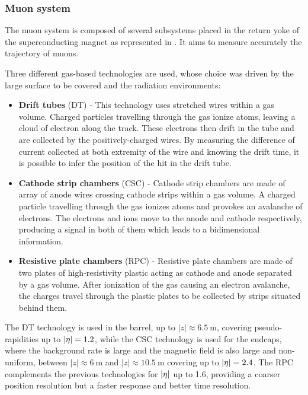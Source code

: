         \subsubsection{Muon system}

    The muon system is composed of several subsystems placed in the return yoke
    of the superconducting magnet as represented in . It
    aims to measure accurately the trajectory of muons.


    Three different gas-based technologies are used, whose choice was driven by
    the large surface to be covered and the radiation environments:
    \begin{itemize}
        \item \textbf{Drift tubes} (DT) - This technology uses stretched wires
            within a gas volume. Charged particles travelling through the gas
            ionize atoms, leaving a cloud of electron along the track. These
            electrons then drift in the tube and are collected by the
            positively-charged wires. By measuring the difference of current
            collected at both extremity of the wire and knowing the drift time,
            it is possible to infer the position of the hit in the drift tube.
        \item \textbf{Cathode strip chambers} (CSC) - Cathode strip chambers are
            made of array of anode wires crossing cathode strips within a gas
            volume.  A charged particle travelling through the gas ionizes atoms
            and provokes an avalanche of electrons. The electrons and ions move
            to the anode and cathode respectively, producing a signal in both of
            them which leads to a bidimensional information.
        \item \textbf{Resistive plate chambers} (RPC) - Resistive plate chambers
            are made of two plates of high-resistivity plastic acting as cathode
            and anode separated by a gas volume. After ionization of the gas
            causing an electron avalanche, the charges travel through the
            plastic plates to be collected by strips situated behind them.
    \end{itemize}

    The DT technology is used in the barrel, up to $\left|z\right| \approx
    6.5~\text{m}$, covering pseudo-rapidities up to $\left| \eta \right| = 1.2$, while the
    CSC technology is used for the endcaps, where the background rate is large
    and the magnetic field is also large and non-uniform, between
    $\left|z\right| \approx 6~\text{m}$ and $\left|z\right| \approx
    10.5~\text{m}$ covering up to $\left| \eta \right| = 2.4$. The RPC complements the
    previous technologies for $\left| \eta \right|$ up to 1.6, providing a coarser position
    resolution but a faster response and better time resolution.

